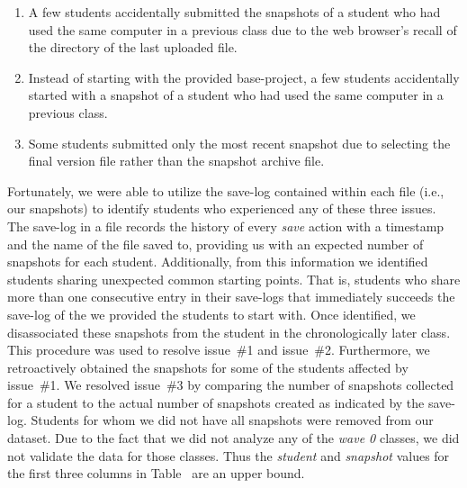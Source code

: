 \begin{enumerate}
\item A few students accidentally submitted the snapshots of a student who had
  used the same computer in a previous class due to the web browser's recall of
  the directory of the last uploaded file.
\item Instead of starting with the provided base-project, a few students
  accidentally started with a snapshot of a student who had used the same
  computer in a previous class.
\item Some students submitted only the most recent snapshot due to selecting
  the final version file rather than the snapshot archive file.
\end{enumerate}

Fortunately, we were able to utilize the save-log contained within each
\sprogram{} file (i.e., our snapshots) to identify students who experienced any
of these three issues. The save-log in a \sprogram{} file records the history
of every \emph{save} action with a timestamp and the name of the file saved to,
providing us with an expected number of snapshots for each
student. Additionally, from this information we identified students sharing
unexpected common starting points. That is, students who share more than one
consecutive entry in their  save-logs that immediately succeeds
the save-log of the \sprogram{} we provided the students to start with. Once
identified, we disassociated these snapshots from the student in the
chronologically later class. This procedure was used to resolve issue~\#1 and
issue~\#2. Furthermore, we retroactively obtained the snapshots for some of the
students affected by issue~\#1. We resolved issue~\#3 by comparing the number
of snapshots collected for a student to the actual number of snapshots created
as indicated by the save-log. Students for whom we did not have all snapshots
were removed from our dataset. Due to the fact that we did not analyze any of
the \emph{wave 0} classes, we did not validate the data for those classes. Thus
the \emph{student} and \emph{snapshot} values for the first three columns in
Table~ are an upper bound.
